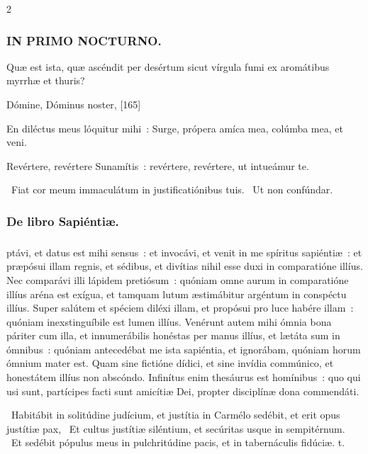 \documentclass[9pt,twoside]{extarticle}
\begin{document}
\begin{multicols}{2}
{\subsubsection*{\center \textsc{IN PRIMO NOCTURNO.}}
\begin{tightlist}{}
\item {} Quæ est ista, quæ ascéndit per desértum sicut vírgula fumi ex aromátibus myrrhæ et thuris?
\item {} Dómine, Dóminus noster,  [165]
\item {} En diléctus meus lóquitur mihi~: Surge, própera amíca mea, colúmba mea, et veni.
\item {} Revértere, revértere Sunamítis~: revértere, revértere, ut intueámur te.
\item {}~Fiat cor meum immaculátum in justificatiónibus tuis. ~Ut non confúndar.
\item {}
\end{tightlist}

\subsubsection*{\center De libro Sapiéntiæ.}
\subsubsection*{\center {} \hfill {}}
ptávi, et datus est mihi sensus~: et invocávi, et venit in me spíritus sapiéntiæ~: et præpósui illam regnis, et sédibus, et divítias nihil esse duxi in comparatióne illíus. Nec comparávi illi lápidem pretiósum~: quóniam omne aurum in comparatióne illíus aréna est exígua, et tamquam lutum æstimábitur argéntum in conspéctu illíus. Super salútem et spéciem diléxi illam, et propósui pro luce habére illam~: quóniam inexstinguíbile est lumen illíus. Venérunt autem mihi ómnia bona páriter cum illa, et innumerábilis honéstas per manus illíus, et lætáta sum in ómnibus~: quóniam antecedébat me ista sapiéntia, et ignorábam, quóniam horum ómnium mater est. Quam sine fictióne dídici, et sine invídia commúnico, et honestátem illíus non abscóndo. Infinítus enim thesáurus est homínibus~: quo qui usi sunt, partícipes facti sunt amicítiæ Dei, propter disciplínæ dona commendáti.

\begin{tightlist}{}
\item {}~Habitábit in solitúdine judícium, et justítia in Carmélo sedébit, et erit opus justítiæ pax, \textred{*}~Et cultus justítiæ siléntium, et secúritas usque in sempitérnum. ~Et sedébit pópulus meus in pulchritúdine pacis, et in tabernáculis fidúciæ. t.
\end{tightlist}

}
\end{multicols}
\end{document}
